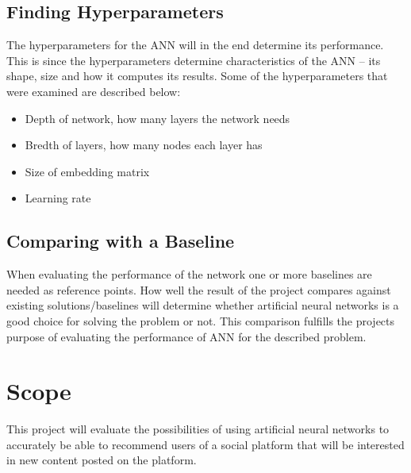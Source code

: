 \subsection{Finding Hyperparameters}
The hyperparameters for the ANN will in the end determine its performance. This is since the hyperparameters determine characteristics of the ANN -- its shape, size and how it computes its results. Some of the hyperparameters that were examined are described below:
\vspace*{0.25cm}
\begin{itemize}
    \item Depth of network, how many layers the network needs
    \item Bredth of layers, how many nodes each layer has
    \item Size of embedding matrix
    \item Learning rate
\end{itemize}

\subsection{Comparing with a Baseline}
When evaluating the performance of the network one or more baselines are needed as reference points. How well the result of the project compares against existing solutions/baselines will determine whether artificial neural networks is a good choice for solving the problem or not. This comparison fulfills the projects purpose of evaluating the performance of ANN for the described problem.

\section{Scope}
This project will evaluate the possibilities of using artificial neural networks to accurately be able to recommend users of a social platform that will be interested in new content posted on the platform.

